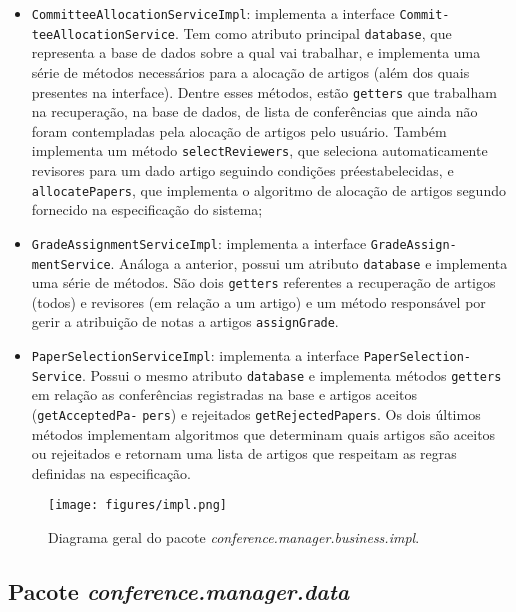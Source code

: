 \documentclass[a4paper, 12pt]{article}
\begin{document}
\begin{itemize}
\item \verb|CommitteeAllocationServiceImpl|: implementa a interface \verb|Commit-| \verb|teeAllocationService|. Tem como atributo principal \verb|database|, que representa a base de dados sobre a qual vai trabalhar, e implementa uma série de métodos necessários para a alocação de artigos (além dos quais presentes na interface). Dentre esses métodos, estão \verb|getters| que trabalham na recuperação, na base de dados, de lista de conferências que ainda não foram contempladas pela alocação de artigos pelo usuário. Também implementa um método \verb|selectReviewers|, que seleciona automaticamente revisores para um dado artigo seguindo condições préestabelecidas, e \verb|allocatePapers|, que implementa o algoritmo de alocação de artigos segundo fornecido na especificação do sistema;

\item \verb|GradeAssignmentServiceImpl|: implementa a interface \verb|GradeAssign-| \verb|mentService|. Análoga a anterior, possui um atributo \verb|database| e implementa uma série de métodos. São dois \verb|getters| referentes a recuperação de artigos (todos) e revisores (em relação a um artigo) e um método responsável por gerir a atribuição de notas a artigos \verb|assignGrade|.

\item \verb|PaperSelectionServiceImpl|: implementa a interface \verb|PaperSelection-| \verb|Service|. Possui o mesmo atributo \verb|database| e implementa métodos \verb|getters| em relação as conferências registradas na base e artigos aceitos (\verb|getAcceptedPa-| \verb|pers|) e rejeitados \verb|getRejectedPapers|. Os dois últimos métodos implementam algoritmos que determinam quais artigos são aceitos ou rejeitados e retornam uma lista de artigos que respeitam as regras definidas na especificação.
\end{itemize}

\begin{figure}[h]
\centering
\texttt{[image: figures/impl.png]}
\caption{Diagrama geral do pacote \emph{conference.manager.business.impl}.}
\label{fig:impl}
\end{figure}

\FloatBarrier

\subsection{Pacote \emph{conference.manager.data}}
\end{document}
